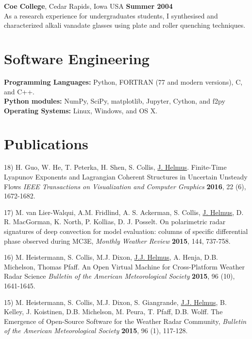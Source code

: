 \documentclass[margin,line]{res}
\begin{document}
\begin{resume}
\vspace{-0.1in}

{\bf Coe College}, Cedar Rapids, Iowa USA \hfill {\bf Summer 2004}\\
As a research experience for undergraduates students,
I synthesised and characterized alkali vanadate glasses using plate and
roller quenching techniques.

\section{\sc Software Engineering}
{\bf Programming Languages:} Python, FORTRAN (77 and modern versions), C, and C++.\\
{\bf Python modules:} NumPy, SciPy, matplotlib, Jupyter, Cython, and f2py\\
{\bf Operating Systems:}  Linux, Windows, and OS X.\\

\section{\sc Publications}

18) H. Guo, W. He, T. Peterka, H. Shen, S. Collis, \underline{J. Helmus}.
Finite-Time Lyapunov Exponents and Lagrangian Coherent Structures in
Uncertain Unsteady Flows
{\em IEEE Transactions on Visualization and Computer Graphics} {\bf 2016},
22 (6), 1672-1682.

17) M. van Lier-Walqui, A.M. Fridlind, A. S. Ackerman, S. Collis,
\underline{J. Helmus}, D. R. MacGorman, K. North, P. Kollias, D. J. Posselt.
On polarimetric radar signatures of deep convection for model evaluation:
columns of specific differential phase observed during MC3E,
{\em Monthly Weather Review} {\bf 2015}, 144, 737-758.

16) M. Heistermann, S. Collis, M.J. Dixon,
\underline{J.J. Helmus}, A. Henja, D.B. Michelson, Thomas Pfaff.
An Open Virtual Machine for Cross-Platform Weather Radar Science
{\em Bulletin of the American Meteorological Society} {\bf 2015},
96 (10), 1641-1645.

15) M. Heistermann, S. Collis, M.J. Dixon, S. Giangrande,
\underline{J.J.  Helmus}, B. Kelley, J. Koistinen, D.B. Michelson, M. Peura,
T. Pfaff, D.B. Wolff.
The Emergence of Open-Source Software for the Weather Radar Community,
{\em Bulletin of the American Meteorological Society} {\bf 2015}, 96 (1), 117-128.


\end{resume}
\end{document}
